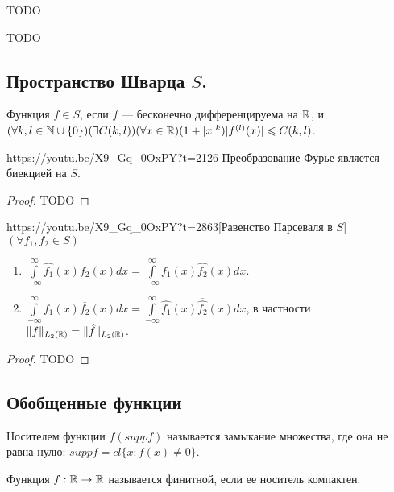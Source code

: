 \begin{note}
	TODO
\end{note}

\begin{note}
	TODO
\end{note}

\subsection{Пространство Шварца $S$.}

\begin{Def}
	Функция $f\in S$, если $f$ --- бесконечно дифференцируема на $\mathbb{R}$, и ${(\forall k, l\in\mathbb{N}\cup\{0\})}(\exists C(k,l))(\forall x\in\mathbb{R})(1+|x|^k)|f^{(l)}(x)|\leqslant C(k,l)$.
\end{Def}

\begin{linkthm}{https://youtu.be/X9_Gq_0OxPY?t=2126} Преобразование Фурье является биекцией на $S$.
\end{linkthm}
\begin{proof}
TODO
\end{proof}

\begin{linkthm}{https://youtu.be/X9_Gq_0OxPY?t=2863}[Равенство Парсеваля в $S$]\ \\
	$(\forall f_1,f_2\in S)$
	\begin{enumerate}
		\item $\int\limits_{-\infty}^{\infty}\hat{f_1}(x)f_2(x)dx=\int\limits_{-\infty}^\infty f_1(x)\hat{f_2}(x)dx$.
		\item $\int\limits_{-\infty}^{\infty} f_1(x)\overline{f_2}(x)dx=\int\limits_{-\infty}^\infty \hat{f_1}(x)\overline{\hat{f_2}}(x)dx$, в частности $\|f\|_{L_2(\mathbb{R})}=\|\hat{f}\|_{L_2(\mathbb{R})}$.
	\end{enumerate}
\end{linkthm}
\begin{proof}
	TODO
\end{proof}

\subsection{Обобщенные функции}
\begin{Def}
	Носителем функции $f(supp f)$ называется замыкание множества, где она не равна нулю: $supp f=cl\{x:f(x)\ne0\}$.
\end{Def}

\begin{Def}
	Функция $f:\mathbb{R}\to\mathbb{R}$ называется финитной, если ее носитель компактен.
\end{Def}

